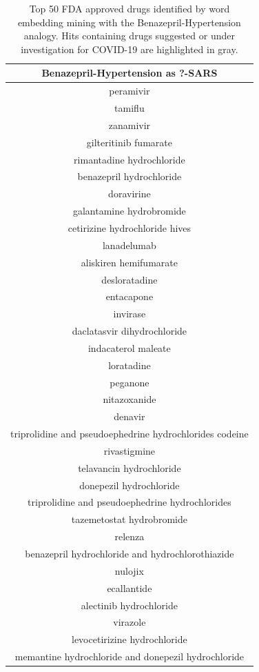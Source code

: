 \documentclass{article}
\begin{document}
\begin{table}[t!]
\footnotesize
\centering
\caption{Top 50 FDA approved drugs identified by word embedding mining with the Benazepril-Hypertension analogy. Hits containing drugs suggested or under investigation for COVID-19 are highlighted in gray.}
\label{tab:drugs_benz_top50}
\begin{tabular}[t]{c}
\hline
Benazepril-Hypertension as ?-SARS \\
\hline
peramivir \\
tamiflu \\
zanamivir \\
gilteritinib fumarate \\
rimantadine hydrochloride \\
benazepril hydrochloride \\
doravirine \\
galantamine hydrobromide \\
cetirizine hydrochloride hives \\
lanadelumab \\
aliskiren hemifumarate \\
desloratadine \\
entacapone \\
invirase \\
daclatasvir dihydrochloride \\
indacaterol maleate \\
loratadine \\
peganone \\
nitazoxanide \\
denavir \\
triprolidine and pseudoephedrine hydrochlorides codeine \\
rivastigmine \\
telavancin hydrochloride \\
donepezil hydrochloride \\
triprolidine and pseudoephedrine hydrochlorides \\
tazemetostat hydrobromide \\
relenza \\
benazepril hydrochloride and hydrochlorothiazide \\
nulojix \\
ecallantide \\
alectinib hydrochloride \\
virazole \\
levocetirizine hydrochloride \\
memantine hydrochloride and donepezil hydrochloride \\

\end{tabular}
\end{table}
\end{document}
